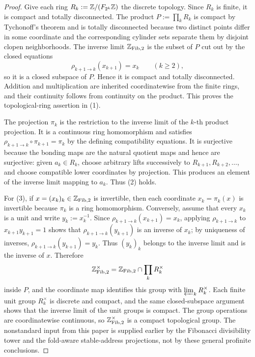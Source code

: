 \begin{proof}
Give each ring \(R_k:=\mathbb{Z}/(F_{2^k}\mathbb{Z})\) the discrete topology. Since \(R_k\) is finite, it is compact and totally disconnected. The product \(P:=\prod_k R_k\) is compact by Tychonoff's theorem and is totally disconnected because two distinct points differ in some coordinate and the corresponding cylinder sets separate them by disjoint clopen neighborhoods. The inverse limit \(\mathbb{Z}_{\mathrm{Fib},2}\) is the subset of \(P\) cut out by the closed equations
\[
\rho_{k+1\to k}(x_{k+1})=x_k\qquad(k\ge2),
\]
so it is a closed subspace of \(P\). Hence it is compact and totally disconnected. Addition and multiplication are inherited coordinatewise from the finite rings, and their continuity follows from continuity on the product. This proves the topological-ring assertion in (1).

The projection \(\pi_k\) is the restriction to the inverse limit of the \(k\)-th product projection. It is a continuous ring homomorphism and satisfies \(\rho_{k+1\to k}\circ\pi_{k+1}=\pi_k\) by the defining compatibility equations. It is surjective because the bonding maps are the natural quotient maps and hence are surjective: given \(a_k\in R_k\), choose arbitrary lifts successively to \(R_{k+1},R_{k+2},\dots\), and choose compatible lower coordinates by projection. This produces an element of the inverse limit mapping to \(a_k\). Thus (2) holds.

For (3), if \(x=(x_k)_k\in \mathbb{Z}_{\mathrm{Fib},2}\) is invertible, then each coordinate \(x_k=\pi_k(x)\) is invertible because \(\pi_k\) is a ring homomorphism. Conversely, assume that every \(x_k\) is a unit and write \(y_k:=x_k^{-1}\). Since \(\rho_{k+1\to k}(x_{k+1})=x_k\), applying \(\rho_{k+1\to k}\) to \(x_{k+1}y_{k+1}=1\) shows that \(\rho_{k+1\to k}(y_{k+1})\) is an inverse of \(x_k\); by uniqueness of inverses, \(\rho_{k+1\to k}(y_{k+1})=y_k\). Thus \((y_k)_k\) belongs to the inverse limit and is the inverse of \(x\). Therefore
\[
\mathbb{Z}_{\mathrm{Fib},2}^\times
=\mathbb{Z}_{\mathrm{Fib},2}\cap \prod_k R_k^\times
\]
inside \(P\), and the coordinate map identifies this group with \(\varprojlim_k R_k^\times\). Each finite unit group \(R_k^\times\) is discrete and compact, and the same closed-subspace argument shows that the inverse limit of the unit groups is compact. The group operations are coordinatewise continuous, so \(\mathbb{Z}_{\mathrm{Fib},2}^\times\) is a compact topological group. The nonstandard input from this paper is supplied earlier by the Fibonacci divisibility tower and the fold-aware stable-address projections, not by these general profinite conclusions.
\end{proof}

